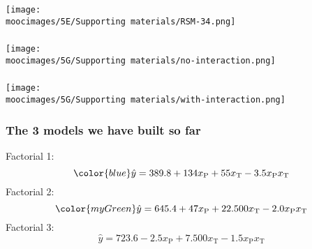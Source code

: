 \documentclass[handout,11pt,aspectratio=169,mathserif]{beamer}
\begin{document}
\begin{frame}\frametitle{}
	\centerline{\texttt{[image: \\moocimages/5E/Supporting materials/RSM-34.png]}}
\end{frame}
\begin{frame}\frametitle{}
	\centerline{\texttt{[image: \\moocimages/5G/Supporting materials/no-interaction.png]}}
\end{frame}
\begin{frame}\frametitle{}
	\centerline{\texttt{[image: \\moocimages/5G/Supporting materials/with-interaction.png]}}
\end{frame}

\begin{frame}\frametitle{The 3 models we have built so far}
	Factorial 1:  
	\[\color{blue}\hat{y} = 389.8  +134  x_\text{P} +  55 x_\text{T} -3.5 x_\text{P}x_\text{T} \]
	Factorial 2: 
	\[\color{myGreen} \hat{y} =  645.4  +47 x_\text{P} +  22.500 x_\text{T} -2.0 x_\text{P}x_\text{T} \]
	Factorial 3:
	\[\hat{y} = 723.6  -2.5 x_\text{P} +  7.500 x_\text{T} -1.5 x_\text{P}x_\text{T} \]
	
\end{frame}
\end{document}
